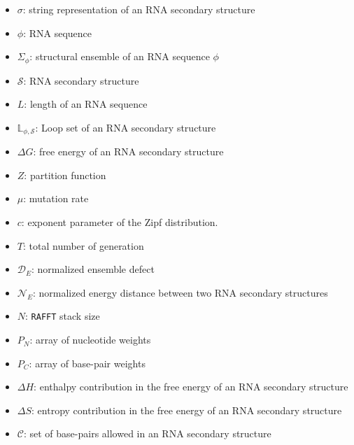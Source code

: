 	\begin{itemize}
		\item $\sigma$: string representation of an RNA secondary structure 
		\item $\phi$: RNA sequence 
		\item $\Sigma_{\phi}$: structural ensemble of an RNA sequence $\phi$
		\item $\mathcal{S}$: RNA secondary structure
		\item $L$: length of an RNA sequence
		\item $\mathbb{L}_{\phi, \mathcal{S}} $: Loop set of an RNA secondary structure
		\item $\Delta G$: free energy of an RNA secondary structure
		\item $Z$: partition function 
		\item $\mu$: mutation rate 
		\item $c$: exponent parameter of the Zipf distribution. 
		\item $T$: total number of generation 
		\item $\mathcal{D}_E$: normalized ensemble defect 
		\item $\mathcal{N}_E$: normalized energy  distance between two RNA secondary structures 
		\item $N$: \texttt{RAFFT} stack size 
		\item $P_N$: array of nucleotide weights
		\item $P_C$: array of base-pair weights
		\item $\Delta H$: enthalpy contribution in the free energy of an RNA secondary structure 
		\item $\Delta S$: entropy contribution in the free energy of an RNA secondary structure 
		\item $\mathcal{C}$: set of base-pairs allowed in an RNA secondary structure
		
	\end{itemize}

	

\endgroup
